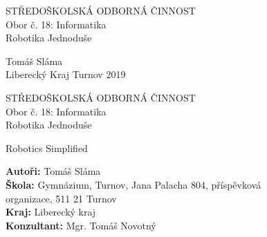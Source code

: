 \documentclass[a4paper, 12pt]{article}
\begin{document}
  \sloppy


  \bfseries

  \begin{center}
    {\fontsize{18}{21.6} \selectfont STŘEDOŠKOLSKÁ ODBORNÁ ČINNOST}\\%
    \vspace*{\baselineskip}
    {\fontsize{14}{16.8} \selectfont Obor č. 18: Informatika}\\%

    \vspace{16em}
    {\fontsize{20}{24} \selectfont Robotika Jednoduše}%
    \vspace*{\fill}
  \end{center}

  \fontsize{16}{19.2} \selectfont
  Tomáš Sláma\\
  Liberecký Kraj
  \hfill
  Turnov 2019


  \newpage
  \begin{center}
    {\fontsize{18}{21.6} \selectfont STŘEDOŠKOLSKÁ ODBORNÁ ČINNOST}\\%
    \vspace*{\baselineskip}
    {\fontsize{14}{16.8} \selectfont Obor č. 18: Informatika}\\%

    \vspace{10em}
    \fontsize{20}{24} \selectfont
    Robotika Jednoduše%

    Robotics Simplified%
    \vspace*{\fill}
  \end{center}

  \normalfont
  \fontsize{16}{19.6} \selectfont

  \textbf{Autoři:} Tomáš Sláma\\
  \textbf{Škola:} Gymnázium, Turnov, Jana Palacha 804, příspěvková \\ organizace, 511 21 Turnov \\
  \textbf{Kraj:} Liberecký kraj \\
  \textbf{Konzultant:} Mgr. Tomáš Novotný

  \vspace{\baselineskip}
\end{document}
